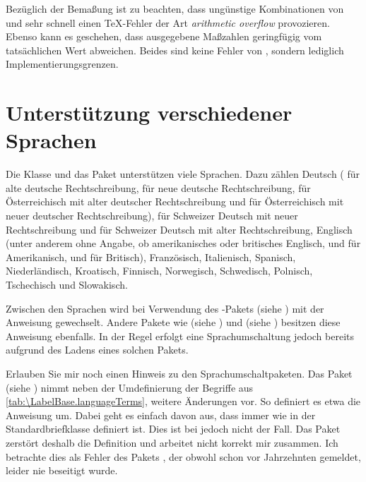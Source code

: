 Bezüglich der Bemaßung ist zu beachten, dass ungünstige Kombinationen von
 und  sehr schnell einen \TeX-Fehler der
Art \emph{arithmetic overflow} provozieren. Ebenso kann es geschehen, dass
ausgegebene Maßzahlen geringfügig vom tatsächlichen Wert abweichen. Beides
sind keine Fehler von , sondern lediglich
Implementierungsgrenzen.
%
\EndIndexGroup
%
\EndIndexGroup
%
\EndIndexGroup


\section{Unterstützung verschiedener Sprachen}
%
\BeginIndexGroup%
%
Die Klasse  und das Paket  unterstützen
viele Sprachen. Dazu zählen Deutsch ( für alte deutsche
Rechtschreibung,  für neue deutsche Rechtschreibung,
 für Österreichisch mit alter deutscher Rechtschreibung und
 für Österreichisch mit
neuer deutscher Rechtschreibung),
 für Schweizer Deutsch
mit neuer Rechtschreibung und  für Schweizer Deutsch mit
alter Rechtschreibung, Englisch (unter anderem  ohne Angabe,
ob amerikanisches oder britisches Englisch,  und
 für Amerikanisch,  und 
für Britisch), Französisch, Italienisch, Spanisch, Niederländisch, Kroatisch,
Finnisch, Norwegisch,
Schwedisch,
Polnisch,
Tschechisch und Slowakisch.

Zwischen den Sprachen wird bei Verwendung des
-Pakets (siehe \cite{package:babel}) mit
der Anweisung  gewechselt. Andere
Pakete wie  (siehe \cite{package:german})
und  (siehe \cite{package:ngerman})
besitzen diese Anweisung ebenfalls. In der Regel erfolgt eine
Sprachumschaltung jedoch bereits aufgrund des Ladens eines solchen Pakets.
\iffalse%
Näheres entnehmen Sie bitte der jeweiligen Anleitung.
\fi

Erlauben Sie mir noch einen Hinweis zu den
Sprachumschaltpaketen. Das Paket
 (siehe
\cite{package:french}) nimmt neben der Umdefinierung der Begriffe aus
\autoref{tab:\LabelBase.languageTerms},
 weitere Änderungen vor. So
definiert es etwa die Anweisung  um. Dabei geht
es einfach davon aus, dass  immer wie in der
Standardbriefklasse  definiert ist. Dies ist bei \KOMAScript{}
jedoch nicht der Fall. Das Paket  zerstört deshalb die
Definition und arbeitet nicht korrekt mir \KOMAScript{} zusammen. Ich
betrachte dies als Fehler des Pakets , der obwohl schon vor
Jahrzehnten gemeldet, leider nie beseitigt wurde.
  
